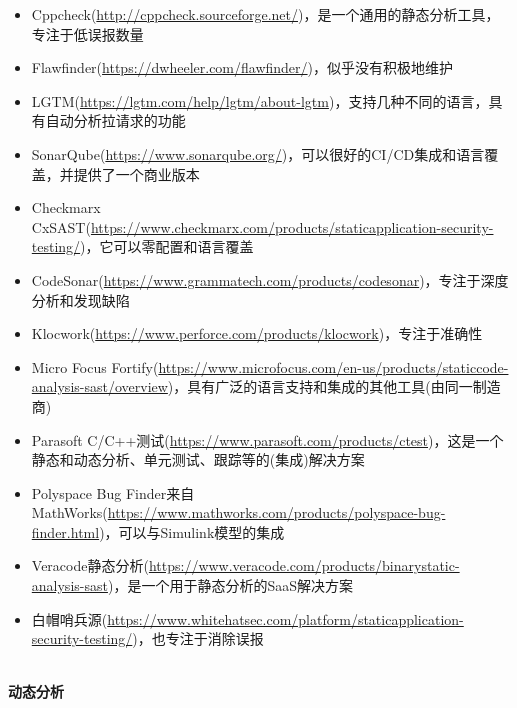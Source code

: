 \begin{itemize}
\item 
Cppcheck(\url{http://cppcheck.sourceforge.net/})，是一个通用的静态分析工具，专注于低误报数量

\item 
Flawfinder(\url{https://dwheeler.com/flawfinder/})，似乎没有积极地维护

\item 
LGTM(\url{https://lgtm.com/help/lgtm/about-lgtm})，支持几种不同的语言，具有自动分析拉请求的功能

\item 
SonarQube(\url{https://www.sonarqube.org/})，可以很好的CI/CD集成和语言覆盖，并提供了一个商业版本

\item 
Checkmarx CxSAST(\url{https://www.checkmarx.com/products/staticapplication-security-testing/})，它可以零配置和语言覆盖

\item 
CodeSonar(\url{https://www.grammatech.com/products/codesonar})，专注于深度分析和发现缺陷

\item 
Klocwork(\url{https://www.perforce.com/products/klocwork})，专注于准确性

\item 
Micro Focus Fortify(\url{https://www.microfocus.com/en-us/products/staticcode-analysis-sast/overview})，具有广泛的语言支持和集成的其他工具(由同一制造商)

\item 
Parasoft C/C++测试(\url{https://www.parasoft.com/products/ctest})，这是一个静态和动态分析、单元测试、跟踪等的(集成)解决方案

\item 
Polyspace Bug Finder来自MathWorks(\url{https://www.mathworks.com/products/polyspace-bug-finder.html})，可以与Simulink模型的集成

\item 
Veracode静态分析(\url{https://www.veracode.com/products/binarystatic-analysis-sast})，是一个用于静态分析的SaaS解决方案

\item 
白帽哨兵源(\url{https://www.whitehatsec.com/platform/staticapplication-security-testing/})，也专注于消除误报
\end{itemize}

\hspace*{\fill} \\ %
\noindent
\textbf{动态分析}

